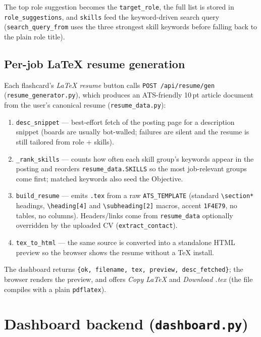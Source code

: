 \documentclass[11pt,a4paper]{article}
\newcommand{\file}[1]{\texttt{\small #1}}
\newcommand{\tool}[1]{\texttt{#1}}
\begin{document}
The top role suggestion becomes the \tool{target\_role}, the full list is stored
in \tool{role\_suggestions}, and \tool{skills} feed the keyword-driven search
query (\tool{search\_query\_from} uses the three strongest skill keywords
before falling back to the plain role title).

\subsection{Per-job LaTeX resume generation}
Each flashcard's \emph{LaTeX resume} button calls \file{POST /api/resume/gen}
(\tool{resume\_generator.py}), which produces an ATS-friendly 10\,pt article
document from the user's canonical resume (\tool{resume\_data.py}):

\begin{enumerate}
  \item \tool{desc\_snippet} --- best-effort fetch of the posting page for a
        description snippet (boards are usually bot-walled; failures are
        silent and the resume is still tailored from role + skills).
  \item \tool{\_rank\_skills} --- counts how often each skill group's keywords
        appear in the posting and reorders \tool{resume\_data.SKILLS} so the
        most job-relevant groups come first; matched keywords also seed the
        Objective.
  \item \tool{build\_resume} --- emits \file{.tex} from a raw \tool{ATS\_TEMPLATE}
        (standard \verb|\section*| headings, \verb|\heading[4]| and
        \verb|\subheading[2]| macros, accent \verb|1F4E79|, no tables, no
        columns). Headers/links come from \tool{resume\_data} optionally
        overridden by the uploaded CV (\tool{extract\_contact}).
  \item \tool{tex\_to\_html} --- the same source is converted into a standalone
        HTML preview so the browser shows the resume without a TeX install.
\end{enumerate}

The dashboard returns \tool{\{ok, filename, tex, preview, desc\_fetched\}}; the
browser renders the preview, and offers \emph{Copy LaTeX} and \emph{Download
.tex} (the file compiles with a plain \tool{pdflatex}).

\section{Dashboard backend (\file{dashboard.py})}
\label{sec:dash}
\end{document}
